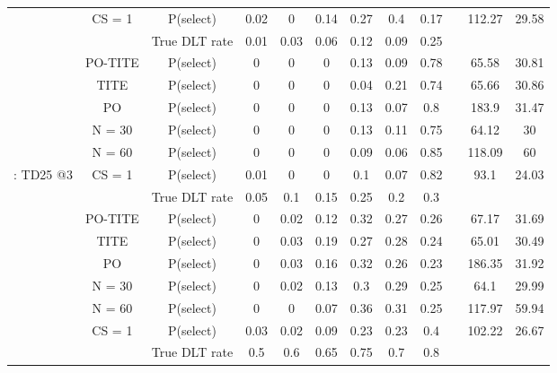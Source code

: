 \begin{table}
\begin{singlespace}
{\begin{tabular}[t]{cccccccccccc}
			\rowcolor{gray!6}  \multirow{-7}{*}{\centering\arraybackslash 13: TD25 @2b} & CS = 1 & P(select) & 0.02 & 0 & 0.14 & 0.27 & 0.4 & 0.17 &  & 112.27 & 29.58\\
			\cmidrule{1-12}
			&  & True DLT rate & 0.01 & 0.03 & 0.06 & 0.12 & 0.09 & 0.25 &  &  & \\
			
			& PO-TITE & P(select) & 0 & 0 & 0 & 0.13 & 0.09 & 0.78 &  & 65.58 & 30.81\\
			
			& TITE & P(select) & 0 & 0 & 0 & 0.04 & 0.21 & 0.74 &  & 65.66 & 30.86\\
			
			& PO & P(select) & 0 & 0 & 0 & 0.13 & 0.07 & 0.8 &  & 183.9 & 31.47\\
			
			& N = 30 & P(select) & 0 & 0 & 0 & 0.13 & 0.11 & 0.75 &  & 64.12 & 30\\
			
			& N = 60 & P(select) & 0 & 0 & 0 & 0.09 & 0.06 & 0.85 &  & 118.09 & 60\\
			
			\multirow{-7}{*}{\centering\arraybackslash 14: TD25 @3} & CS = 1 & P(select) & 0.01 & 0 & 0 & 0.1 & 0.07 & 0.82 &  & 93.1 & 24.03\\
			\cmidrule{1-12}
			\rowcolor{gray!6}   &  & True DLT rate & 0.05 & 0.1 & 0.15 & 0.25 & 0.2 & 0.3 &  &  & \\
			
			\rowcolor{gray!6}   & PO-TITE & P(select) & 0 & 0.02 & 0.12 & 0.32 & 0.27 & 0.26 &  & 67.17 & 31.69\\
			
			\rowcolor{gray!6}   & TITE & P(select) & 0 & 0.03 & 0.19 & 0.27 & 0.28 & 0.24 &  & 65.01 & 30.49\\
			
			\rowcolor{gray!6}   & PO & P(select) & 0 & 0.03 & 0.16 & 0.32 & 0.26 & 0.23 &  & 186.35 & 31.92\\
			
			\rowcolor{gray!6}   & N = 30 & P(select) & 0 & 0.02 & 0.13 & 0.3 & 0.29 & 0.25 &  & 64.1 & 29.99\\
			
			\rowcolor{gray!6}   & N = 60 & P(select) & 0 & 0 & 0.07 & 0.36 & 0.31 & 0.25 &  & 117.97 & 59.94\\
			
			\rowcolor{gray!6}  \multirow{-7}{*}{\centering\arraybackslash 15: Equal steps} & CS = 1 & P(select) & 0.03 & 0.02 & 0.09 & 0.23 & 0.23 & 0.4 &  & 102.22 & 26.67\\
			\cmidrule{1-12}
			&  & True DLT rate & 0.5 & 0.6 & 0.65 & 0.75 & 0.7 & 0.8 &  &  & \\
			

\end{tabular}}
\end{singlespace}
\end{table}
